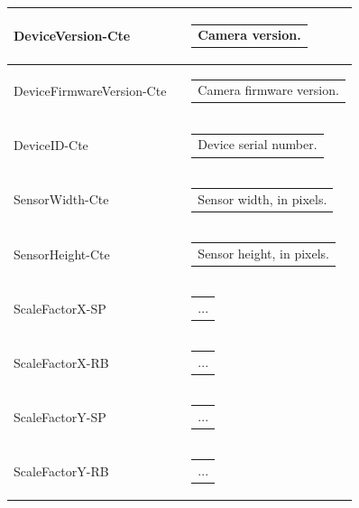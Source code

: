 \documentclass[openany]{article}
\begin{document}
\begin{longtable}{| m{3.0cm} m{4.5cm} m{7.0cm} |}
        DeviceVersion-Cte &  & \begin{tabular}{@{}m{6cm}@{}}
                Camera version.
            \end{tabular} \hypertarget{pv:firmware-version}{}\\ \hline
        DeviceFirmwareVersion-Cte &  & \begin{tabular}{@{}m{6cm}@{}}
                Camera firmware version.
            \end{tabular} \hypertarget{pv:device-id}{}\\ \hline
        DeviceID-Cte &  & \begin{tabular}{@{}m{6cm}@{}}
                Device serial number.
            \end{tabular} \hypertarget{pv:sensor-width}{}\\ \hline
        SensorWidth-Cte &  & \begin{tabular}{@{}m{6cm}@{}}
                Sensor width, in pixels.
            \end{tabular} \hypertarget{pv:sensor-height}{}\\ \hline
        SensorHeight-Cte &  & \begin{tabular}{@{}m{6cm}@{}}
                Sensor height, in pixels.
            \end{tabular} \hypertarget{pv:scale-factor-x}{}\\ \hline
        ScaleFactorX-SP &  & \begin{tabular}{@{}m{6cm}@{}}
                ...
            \end{tabular} \\ \hline
        ScaleFactorX-RB &  & \begin{tabular}{@{}m{6cm}@{}}
                ...
            \end{tabular} \hypertarget{pv:scale-factor-y}{}\\ \hline
        ScaleFactorY-SP &  & \begin{tabular}{@{}m{6cm}@{}}
                ...
            \end{tabular} \\ \hline
        ScaleFactorY-RB &  & \begin{tabular}{@{}m{6cm}@{}}
                ...
            \end{tabular} \hypertarget{pv:center-offset-x}{}\\ \hline

\end{longtable}
\end{document}
